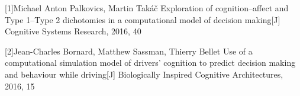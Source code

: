 \documentclass[twoside,11pt]{article}
\begin{document}
\vskip 0.2in
 

[1]Michael Anton Palkovics, Martin Takáč Exploration of cognition–affect and Type 1–Type 2 dichotomies in a computational model of decision making[J]  Cognitive Systems Research, 2016, 40

[2]Jean-Charles Bornard, Matthew Sassman, Thierry Bellet Use of a computational simulation model of drivers’ cognition to predict decision making and behaviour while driving[J]  Biologically Inspired Cognitive Architectures, 2016, 15
\end{document}
